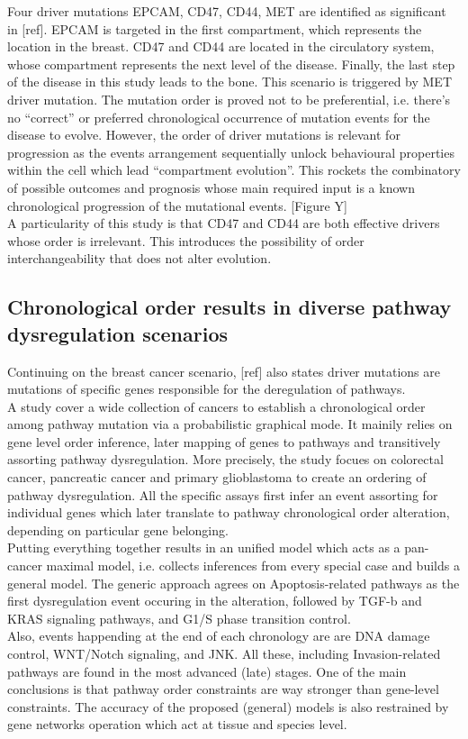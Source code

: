 Four driver mutations {EPCAM, CD47, CD44, MET} are identified as significant in [ref]. EPCAM is targeted in the first compartment, which represents the location in the breast. CD47 and CD44 are located in the circulatory system, whose compartment represents the next level of the disease. Finally, the last step of the disease in this study leads to the bone. This scenario is triggered by MET driver mutation. The mutation order is proved not to be preferential, i.e. there’s no “correct” or preferred chronological occurrence of mutation events for the disease to evolve. However, the order of driver mutations is relevant for progression as the events arrangement sequentially unlock behavioural properties within the cell which lead “compartment evolution”. This rockets the combinatory of possible outcomes and prognosis whose main required input is a known chronological progression of the mutational events. [Figure Y]
\\

A particularity of this study is that CD47 and CD44 are both effective drivers whose order is irrelevant. This introduces the possibility of order interchangeability that does not alter evolution.
\\
\subsection{Chronological order results in diverse pathway dysregulation scenarios}
Continuing on the breast cancer scenario, [ref] also states driver mutations are mutations of specific genes responsible for the deregulation of pathways.
\\

A study \cite{Gerstung2011TheTumorigenesis} cover a wide collection of cancers to establish a chronological order among pathway mutation via a probabilistic graphical mode. It mainily relies on gene level order inference, later mapping of genes to pathways and transitively assorting pathway dysregulation. More precisely, the study focues on colorectal cancer, pancreatic cancer and primary glioblastoma to create an ordering of pathway dysregulation. All the specific assays first infer an event assorting for individual genes which later translate to pathway chronological order alteration, depending on particular gene belonging.\\

Putting everything together results in an unified model which acts as a pan-cancer maximal model, i.e. collects inferences from every special case and builds a general model. The generic approach agrees on Apoptosis-related pathways as the first dysregulation event occuring in the alteration, followed by TGF-b and KRAS signaling pathways, and G1/S phase transition control. \\
Also, events happending at the end of each chronology are are DNA damage control, WNT/Notch signaling, and JNK. All these, including Invasion-related pathways are found in the most advanced (late) stages.
One of the main conclusions is that pathway order constraints are way stronger than gene-level constraints.
The accuracy of the proposed (general) models is also restrained by gene networks operation which act at tissue and species level.

